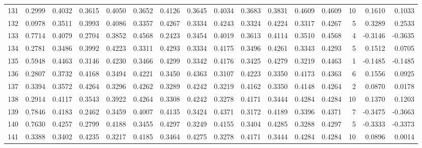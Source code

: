 \begin{tabular}{lrrrrrrrrrrrrrrr}
131 &      0.2999 &  0.4032 &  0.3615 &  0.4050 &  0.3652 &  0.4126 &  0.3645 &  0.4034 &  0.3683 &  0.3831 &   0.4609 &     0.4609 &     10 &                    0.1610 &                     0.1033 \\
132 &      0.0978 &  0.3511 &  0.3993 &  0.4086 &  0.3357 &  0.4267 &  0.3334 &  0.4243 &  0.3324 &  0.4224 &   0.3317 &     0.4267 &      5 &                    0.3289 &                     0.2533 \\
133 &      0.7714 &  0.4079 &  0.2704 &  0.3852 &  0.4568 &  0.2423 &  0.3454 &  0.4019 &  0.3613 &  0.4114 &   0.3510 &     0.4568 &      4 &                   -0.3146 &                    -0.3635 \\
134 &      0.2781 &  0.3486 &  0.3992 &  0.4223 &  0.3311 &  0.4293 &  0.3334 &  0.4175 &  0.3496 &  0.4261 &   0.3343 &     0.4293 &      5 &                    0.1512 &                     0.0705 \\
135 &      0.5948 &  0.4463 &  0.3146 &  0.4230 &  0.3466 &  0.4299 &  0.3342 &  0.4176 &  0.3425 &  0.4279 &   0.3219 &     0.4463 &      1 &                   -0.1485 &                    -0.1485 \\
136 &      0.2807 &  0.3732 &  0.4168 &  0.3494 &  0.4221 &  0.3450 &  0.4363 &  0.3107 &  0.4223 &  0.3350 &   0.4173 &     0.4363 &      6 &                    0.1556 &                     0.0925 \\
137 &      0.3394 &  0.3572 &  0.4264 &  0.3296 &  0.4262 &  0.3289 &  0.4242 &  0.3219 &  0.4162 &  0.3350 &   0.4148 &     0.4264 &      2 &                    0.0870 &                     0.0178 \\
138 &      0.2914 &  0.4117 &  0.3543 &  0.3922 &  0.4264 &  0.3308 &  0.4242 &  0.3278 &  0.4171 &  0.3444 &   0.4284 &     0.4284 &     10 &                    0.1370 &                     0.1203 \\
139 &      0.7846 &  0.4183 &  0.2462 &  0.3459 &  0.4007 &  0.4135 &  0.3424 &  0.4371 &  0.3172 &  0.4189 &   0.3396 &     0.4371 &      7 &                   -0.3475 &                    -0.3663 \\
140 &      0.7630 &  0.4257 &  0.2799 &  0.4188 &  0.3455 &  0.4297 &  0.3249 &  0.4155 &  0.3404 &  0.4285 &   0.3288 &     0.4297 &      5 &                   -0.3333 &                    -0.3373 \\
141 &      0.3388 &  0.3402 &  0.4235 &  0.3217 &  0.4185 &  0.3464 &  0.4275 &  0.3278 &  0.4171 &  0.3444 &   0.4284 &     0.4284 &     10 &                    0.0896 &                     0.0014 \\

\end{tabular}
